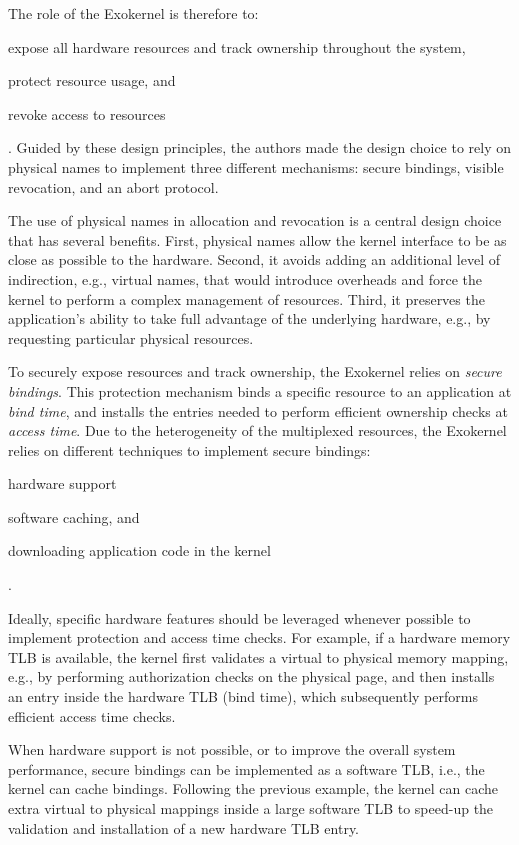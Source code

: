 The role of the Exokernel is therefore to:
\begin{enumerate*}
	\item \label{expose} expose all hardware resources and track ownership throughout the system,
	\item \label{protect} protect resource usage, and
	\item \label{revoke} revoke access to resources
\end{enumerate*}.
Guided by these design principles, the authors made the design choice to rely on physical names to implement three different mechanisms: secure bindings, visible revocation, and an abort protocol.

The use of physical names in allocation and revocation is a central design choice that has several benefits.
First, physical names allow the kernel interface to be as close as possible to the hardware.
Second, it avoids adding an additional level of indirection, e.g., virtual names, that would introduce overheads and force the kernel to perform a complex management of resources.
Third, it preserves the application's ability to take full advantage of the underlying hardware, e.g., by requesting particular physical resources.

To securely expose resources and track ownership, the Exokernel relies on \emph{secure bindings}.
This protection mechanism binds a specific resource to an application at \emph{bind time}, and installs the entries needed to perform efficient ownership checks at \emph{access time}.
Due to the heterogeneity of the multiplexed resources, the Exokernel relies on different techniques to implement secure bindings:
\begin{enumerate*}
	\item hardware support
	\item software caching, and
	\item downloading application code in the kernel
\end{enumerate*}.

Ideally, specific hardware features should be leveraged whenever possible to implement protection and access time checks.
For example, if a hardware memory TLB is available, the kernel first validates a virtual to physical memory mapping, e.g., by performing authorization checks on the physical page, and then installs an entry inside the hardware TLB (bind time), which subsequently performs efficient access time checks.

When hardware support is not possible, or to improve the overall system performance, secure bindings can be implemented as a software TLB, i.e., the kernel can cache bindings.
Following the previous example, the kernel can cache extra virtual to physical mappings inside a large software TLB to speed-up the validation and installation of a new hardware TLB entry.

